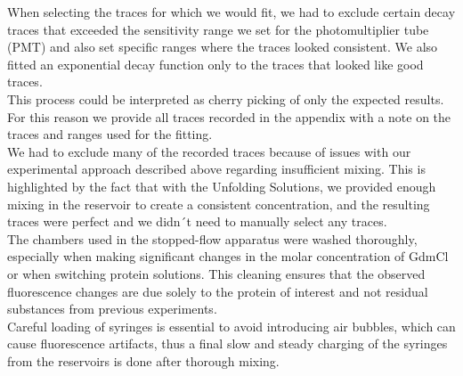 \documentclass[a4paper,english,12pt,bibliography=totoc]{scrreprt}
\begin{document}

When selecting the traces for which we would fit, we had to exclude certain decay traces that exceeded the sensitivity range we set for the photomultiplier tube (PMT) and also set specific ranges where the traces looked consistent.
We also fitted an exponential decay function only to the traces that looked like good traces.\\
This process could be interpreted as cherry picking of only the expected results. For this reason we provide all traces recorded in the appendix with a note on the traces and ranges used for the fitting.\\

We had to exclude many of the recorded traces because of issues with our experimental approach described above regarding insufficient mixing.
This is highlighted by the fact that with the Unfolding Solutions, we provided enough mixing in the reservoir to create a consistent concentration, and the resulting traces were perfect and we didn´t need to manually select any traces.\\



The chambers used in the stopped-flow apparatus were washed thoroughly, especially when making significant changes in the molar concentration of GdmCl or when switching protein solutions. This cleaning ensures that the observed fluorescence changes are due solely to the protein of interest and not residual substances from previous experiments.\\

Careful loading of syringes is essential to avoid introducing air bubbles, which can cause fluorescence artifacts, thus a final slow and steady charging of the syringes from the reservoirs is done after thorough mixing.\\



\end{document}
